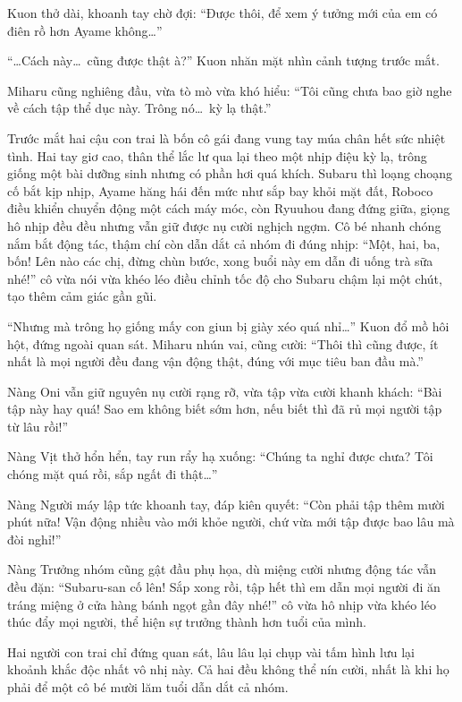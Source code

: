 \documentclass[../main.tex]{subfiles}
\begin{document}
Kuon thở dài, khoanh tay chờ đợi: ``Được thôi, để xem ý tưởng mới của em có điên rồ hơn Ayame không\dots''

\ct

``\dots Cách này\dots\ cũng được thật à?'' Kuon nhăn mặt nhìn cảnh tượng trước mắt.

Miharu cũng nghiêng đầu, vừa tò mò vừa khó hiểu: ``Tôi cũng chưa bao giờ nghe về cách tập thể dục này. Trông nó\dots\ kỳ lạ thật.''

Trước mắt hai cậu con trai là bốn cô gái đang vung tay múa chân hết sức nhiệt tình. Hai tay giơ cao, thân thể lắc lư qua lại theo một nhịp điệu kỳ lạ, trông giống một bài dưỡng sinh nhưng có phần hơi quá khích. Subaru thì loạng choạng cố bắt kịp nhịp, Ayame hăng hái đến mức như sắp bay khỏi mặt đất, Roboco điều khiển chuyển động một cách máy móc, còn Ryuuhou đang đứng giữa, giọng hô nhịp đều đều nhưng vẫn giữ được nụ cười nghịch ngợm. Cô bé nhanh chóng nắm bắt động tác, thậm chí còn dẫn dắt cả nhóm đi đúng nhịp: ``Một, hai, ba, bốn! Lên nào các chị, đừng chùn bước, xong buổi này em dẫn đi uống trà sữa nhé!'' cô vừa nói vừa khéo léo điều chỉnh tốc độ cho Subaru chậm lại một chút, tạo thêm cảm giác gần gũi.


``Nhưng mà trông họ giống mấy con giun bị giày xéo quá nhỉ\dots'' Kuon đổ mồ hôi hột, đứng ngoài quan sát. Miharu nhún vai, cũng cười: ``Thôi thì cũng được, ít nhất là mọi người đều đang vận động thật, đúng với mục tiêu ban đầu mà.''

Nàng Oni vẫn giữ nguyên nụ cười rạng rỡ, vừa tập vừa cười khanh khách: ``Bài tập này hay quá! Sao em không biết sớm hơn, nếu biết thì đã rủ mọi người tập từ lâu rồi!''

Nàng Vịt thở hổn hển, tay run rẩy hạ xuống: ``Chúng ta nghỉ được chưa? Tôi chóng mặt quá rồi, sắp ngất đi thật\dots''

Nàng Người máy lập tức khoanh tay, đáp kiên quyết: ``Còn phải tập thêm mười phút nữa! Vận động nhiều vào mới khỏe người, chứ vừa mới tập được bao lâu mà đòi nghỉ!''

Nàng Trưởng nhóm cũng gật đầu phụ họa, dù miệng cười nhưng động tác vẫn đều đặn: ``Subaru-san cố lên! Sắp xong rồi, tập hết thì em dẫn mọi người đi ăn tráng miệng ở cửa hàng bánh ngọt gần đây nhé!'' cô vừa hô nhịp vừa khéo léo thúc đẩy mọi người, thể hiện sự trưởng thành hơn tuổi của mình.

Hai người con trai chỉ đứng quan sát, lâu lâu lại chụp vài tấm hình lưu lại khoảnh khắc độc nhất vô nhị này. Cả hai đều không thể nín cười, nhất là khi họ phải để một cô bé mười lăm tuổi dẫn dắt cả nhóm.
\end{document}
